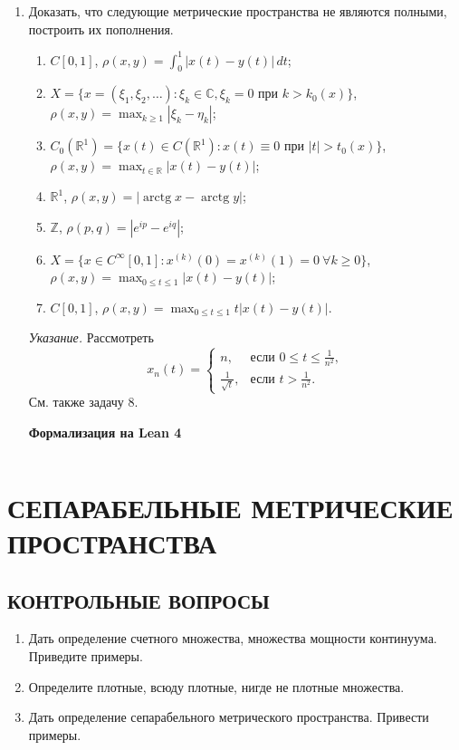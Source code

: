 \documentclass[12pt,a4paper]{article}
\begin{document}
\begin{enumerate}
\newpage
\item Доказать, что следующие метрические пространства не являются полными, построить их пополнения.
\begin{enumerate}[label=\alph*)]
\item $C[0, 1]$, $\rho(x, y) = \int_{0}^{1} |x(t) - y(t)| \, dt$;
\item $X = \{x = (\xi_{1}, \xi_{2}, \dots) : \xi_{k} \in \mathbb{C}, \xi_{k}=0 \text{ при } k > k_{0}(x)\}$, \\ $\rho(x, y) = \max_{k\ge1} |\xi_{k} - \eta_{k}|$;
\item $C_{0}(\mathbb{R}^{1}) = \{x(t) \in C(\mathbb{R}^{1}) : x(t) \equiv 0 \text{ при } |t| > t_{0}(x)\}$, \\ $\rho(x, y) = \max_{t\in\mathbb{R}} |x(t) - y(t)|$;
\item $\mathbb{R}^{1}$, $\rho(x, y) = |\operatorname{arctg} x - \operatorname{arctg} y|$;
\item $\mathbb{Z}$, $\rho(p, q) = |e^{ip} - e^{iq}|$;
\item $X = \{x \in C^{\infty}[0, 1] : x^{(k)}(0) = x^{(k)}(1) = 0 \ \forall k \ge 0\}$, \\ $\rho(x, y) = \max_{0\le t\le1} |x(t) - y(t)|$;
\item $C[0, 1]$, $\rho(x, y) = \max_{0\le t\le1} t|x(t) - y(t)|$.
\end{enumerate}
\textit{Указание.} Рассмотреть
$$x_{n}(t) =
\begin{cases} n, & \text{если } 0 \le t \le \frac{1}{n^{2}}, \\ \frac{1}{\sqrt{t}}, & \text{если } t > \frac{1}{n^{2}}.
\end{cases}$$
См. также задачу 8.

\begin{center}\small\textbf{Формализация на Lean 4}\end{center}
\inputminted{lean}{FunAn/Section08_CompleteMetric/Task06.lean}

\end{enumerate}

\section{СЕПАРАБЕЛЬНЫЕ МЕТРИЧЕСКИЕ ПРОСТРАНСТВА}

\subsection*{КОНТРОЛЬНЫЕ ВОПРОСЫ}
\begin{enumerate}
\item Дать определение счетного множества, множества мощности континуума. Приведите примеры.
\item Определите плотные, всюду плотные, нигде не плотные множества.
\item Дать определение сепарабельного метрического пространства. Привести примеры.
\end{enumerate}
\end{document}
